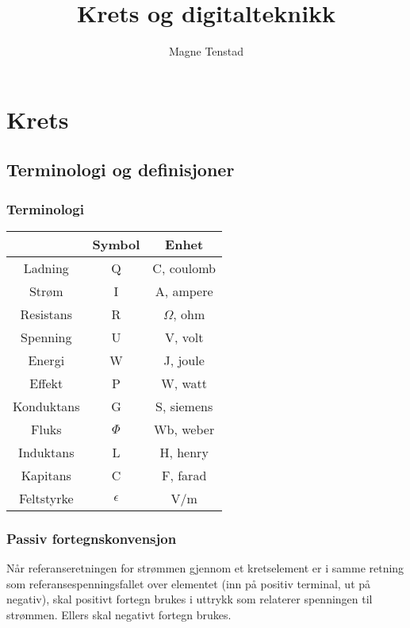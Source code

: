 \documentclass{article}
\title{Krets og digitalteknikk}
\author{Magne Tenstad}
\begin{document}
\maketitle

\clearpage

\tableofcontents

\clearpage

\section{Krets}


\subsection{Terminologi og definisjoner}


\subsubsection{Terminologi}
\begin{table}[h]
    \centering
    \begin{tabular}{c|c|c}
                    & Symbol & Enhet \\
        \hline
        Ladning     & Q & C, coulomb \\
        Strøm       & I & A, ampere \\
        Resistans   & R & $\Omega$, ohm \\
        Spenning    & U & V, volt \\
        Energi      & W & J, joule \\
        Effekt      & P & W, watt \\
        Konduktans  & G & S, siemens \\
        Fluks       & $\Phi$ & Wb, weber \\
        Induktans   & L & H, henry \\
        Kapitans    & C & F, farad \\
        Feltstyrke  & $\epsilon$ & V/m
    \end{tabular}
\end{table}


\subsubsection{Passiv fortegnskonvensjon}
Når referanseretningen for strømmen gjennom et kretselement er i samme retning
som referansespenningsfallet over elementet (inn på positiv terminal, ut på negativ), skal positivt fortegn brukes i uttrykk som relaterer spenningen til strømmen. Ellers skal negativt fortegn brukes.
\end{document}
